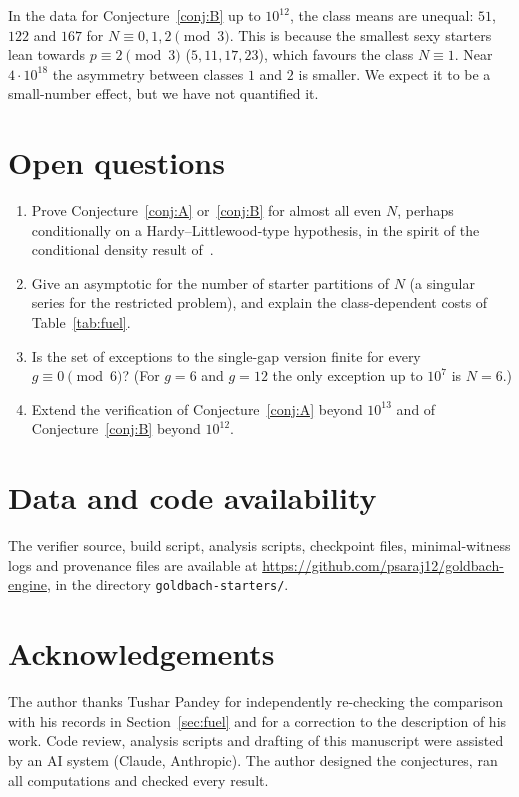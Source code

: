 \documentclass[11pt]{article}
\theoremstyle{definition}
\theoremstyle{remark}
\begin{document}
In the data for Conjecture~\ref{conj:B} up to $10^{12}$, the class means are
unequal: $51$, $122$ and $167$ for $N\equiv 0,1,2\pmod 3$. This is because the smallest
sexy starters lean towards $p\equiv 2\pmod 3$ ($5,11,17,23$), which favours the
class $N\equiv1$. Near $4\cdot10^{18}$ the asymmetry between classes $1$ and
$2$ is smaller. We expect it to be a small-number effect, but we have not
quantified it.

\section{Open questions}
\begin{enumerate}
\item Prove Conjecture~\ref{conj:A} or~\ref{conj:B} for almost all even $N$,
perhaps conditionally on a Hardy--Littlewood-type hypothesis, in the spirit of
the conditional density result of~\cite{Pandey}.
\item Give an asymptotic for the number of starter partitions of $N$ (a
singular series for the restricted problem), and explain the class-dependent
costs of Table~\ref{tab:fuel}.
\item Is the set of exceptions to the single-gap version finite for every
$g\equiv0\pmod 6$? (For $g=6$ and $g=12$ the only exception up to $10^7$ is
$N=6$.)
\item Extend the verification of Conjecture~\ref{conj:A} beyond $10^{13}$ and of
Conjecture~\ref{conj:B} beyond $10^{12}$.
\end{enumerate}

\section*{Data and code availability}
The verifier source, build script, analysis scripts, checkpoint files, minimal-witness
logs and provenance files are available at \url{https://github.com/psaraj12/goldbach-engine}, in the directory
\texttt{goldbach-starters/}.

\section*{Acknowledgements}
The author thanks Tushar Pandey for independently re-checking the comparison with his
records in Section~\ref{sec:fuel} and for a correction to the description of his work.
Code review, analysis scripts and drafting of this manuscript were assisted by an
AI system (Claude, Anthropic). The author designed the conjectures, ran all
computations and checked every result.
\end{document}
